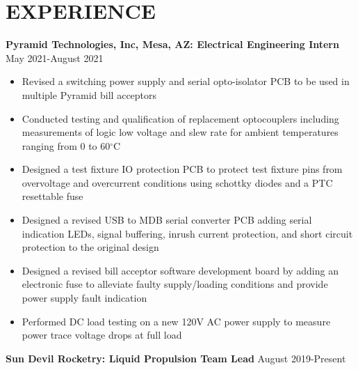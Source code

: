 \documentclass{article}
\begin{document}
\section{EXPERIENCE}
\textbf{Pyramid Technologies, Inc, Mesa, AZ: Electrical Engineering Intern}
\hfill 
\vspace{0.5em}
May 2021-August 2021
\begin{itemize}
\item{Revised a switching power supply and serial opto-isolator PCB to be used in multiple Pyramid bill acceptors}
\item{Conducted testing and qualification of replacement optocouplers including measurements of logic low voltage and slew rate for ambient temperatures ranging from 0 to 60$^{\circ}$C}
\item{Designed a test fixture IO protection PCB to protect test fixture pins from overvoltage and overcurrent conditions using schottky diodes and a PTC resettable fuse}
\item{Designed a revised USB to MDB serial converter PCB adding serial indication LEDs, signal buffering, inrush current protection, and short circuit protection to the original design}
\item{Designed a revised bill acceptor software development board by adding an electronic fuse to alleviate faulty supply/loading conditions and provide power supply fault indication}
\item{Performed DC load testing on a new 120V AC power supply to measure power trace voltage drops at full load}
\end{itemize}
\vspace{0.5em}
\textbf{Sun Devil Rocketry: Liquid Propulsion Team Lead}
\hfill
\vspace{0.5em}
August 2019-Present
\end{document}
